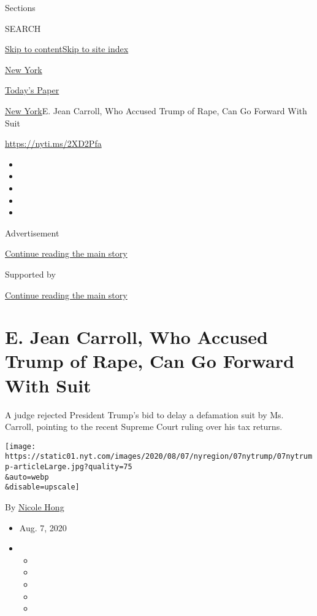 Sections

SEARCH

\protect\hyperlink{site-content}{Skip to
content}\protect\hyperlink{site-index}{Skip to site index}

\href{https://www.nytimes.com/section/nyregion}{New York}

\href{https://myaccount.nytimes.com/auth/login?response_type=cookie\&client_id=vi}{}

\href{https://www.nytimes.com/section/todayspaper}{Today's Paper}

\href{/section/nyregion}{New York}\textbar{}E. Jean Carroll, Who Accused
Trump of Rape, Can Go Forward With Suit

\href{https://nyti.ms/2XD2Pfa}{https://nyti.ms/2XD2Pfa}

\begin{itemize}
\item
\item
\item
\item
\item
\end{itemize}

Advertisement

\protect\hyperlink{after-top}{Continue reading the main story}

Supported by

\protect\hyperlink{after-sponsor}{Continue reading the main story}

\hypertarget{e-jean-carroll-who-accused-trump-of-rape-can-go-forward-with-suit}{%
\section{E. Jean Carroll, Who Accused Trump of Rape, Can Go Forward With
Suit}\label{e-jean-carroll-who-accused-trump-of-rape-can-go-forward-with-suit}}

A judge rejected President Trump's bid to delay a defamation suit by Ms.
Carroll, pointing to the recent Supreme Court ruling over his tax
returns.

\texttt{[image: https://static01.nyt.com/images/2020/08/07/nyregion/07nytrump/07nytrump-articleLarge.jpg?quality=75\\\&auto=webp\\\&disable=upscale]}

By \href{https://www.nytimes.com/by/nicole-hong}{Nicole Hong}

\begin{itemize}
\item
  Aug. 7, 2020
\item
  \begin{itemize}
  \item
  \item
  \item
  \item
  \item
  \end{itemize}
\end{itemize}

